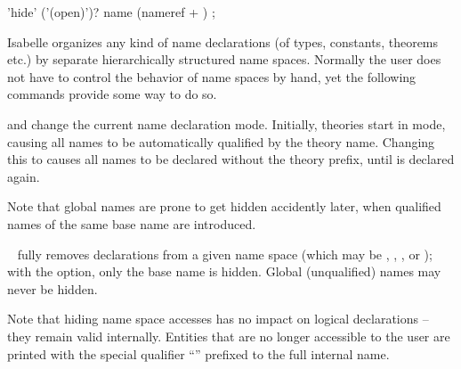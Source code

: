 \begin{isabellebody}
\begin{isamarkuptext}
  \begin{rail}
    'hide' ('(open)')? name (nameref + )
    ;
  \end{rail}

  Isabelle organizes any kind of name declarations (of types,
  constants, theorems etc.) by separate hierarchically structured name
  spaces.  Normally the user does not have to control the behavior of
  name spaces by hand, yet the following commands provide some way to
  do so.

  \begin{descr}

  \item [\isa{\isacommand{global}} and \isa{\isacommand{local}}] change the
  current name declaration mode.  Initially, theories start in
   mode, causing all names to be automatically
  qualified by the theory name.  Changing this to 
  causes all names to be declared without the theory prefix, until
   is declared again.
  
  Note that global names are prone to get hidden accidently later,
  when qualified names of the same base name are introduced.
  
  \item [\isa{\isacommand{hide}}~\isa{space\ names}] fully removes
  declarations from a given name space (which may be ,
  , , or ); with the  option, only the base name is hidden.  Global
  (unqualified) names may never be hidden.
  
  Note that hiding name space accesses has no impact on logical
  declarations -- they remain valid internally.  Entities that are no
  longer accessible to the user are printed with the special qualifier
  ``\isa{{\isacharquery}{\isacharquery}}'' prefixed to the full internal name.


\end{descr}
\end{isamarkuptext}
\end{isabellebody}
